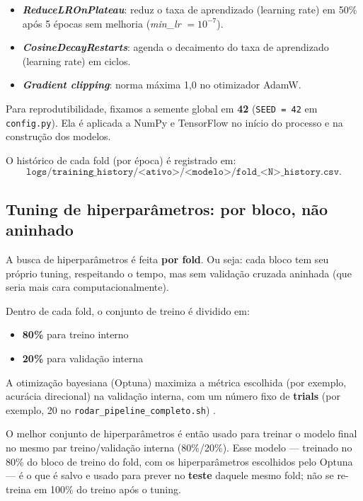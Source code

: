 \begin{itemize}
  \item \textbf{\emph{ReduceLROnPlateau}}: reduz o taxa de aprendizado (learning rate) em 50\%
        após 5 épocas sem melhoria (\emph{min\_lr} $=10^{-7}$).
  \item \textbf{\emph{CosineDecayRestarts}}: agenda o decaimento do taxa de aprendizado (learning rate) em ciclos.
  \item \textbf{\emph{Gradient clipping}}: norma máxima 1,0 no otimizador AdamW.
\end{itemize}

Para reprodutibilidade, fixamos a semente global em \textbf{42}
(\texttt{SEED = 42} em \texttt{config.py}).
Ela é aplicada a NumPy e TensorFlow no início do processo e na construção dos modelos.

O histórico de cada fold (por época) é registrado em:
\[
\texttt{logs/training\_history/<ativo>/<modelo>/fold\_<N>\_history.csv}.
\]

\subsection{Tuning de hiperparâmetros: por bloco, não aninhado}
A busca de hiperparâmetros é feita \textbf{por fold}.
Ou seja: cada bloco tem seu próprio tuning, respeitando o tempo,
mas sem validação cruzada aninhada (que seria mais cara computacionalmente).

Dentro de cada fold, o conjunto de treino é dividido em:

\begin{itemize}
  \item \textbf{80\%} para treino interno
  \item \textbf{20\%} para validação interna
\end{itemize}

A otimização bayesiana (Optuna) maximiza a métrica escolhida
(por exemplo, acurácia direcional) na validação interna,
com um número fixo de \textbf{trials} (por exemplo, 20 no
\texttt{rodar\_pipeline\_completo.sh}) \cite{akiba2019}.

O melhor conjunto de hiperparâmetros é então usado para treinar o modelo
final no mesmo par treino/validação interna (80\%/20\%).
Esse modelo --- treinado no 80\% do bloco de treino do fold, com os hiperparâmetros
escolhidos pelo Optuna --- é o que é salvo e usado para prever no \textbf{teste}
daquele mesmo fold; não se re-treina em 100\% do treino após o tuning.

